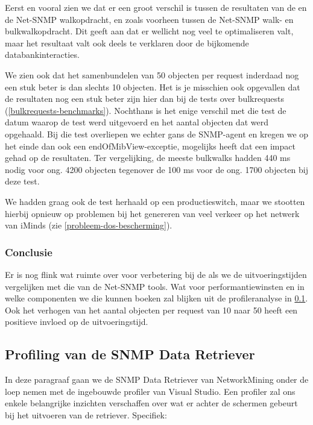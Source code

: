 Eerst en vooral zien we dat er een groot verschil is tussen de resultaten van de \nwmretriever{}
en de Net-SNMP walkopdracht, en zoals voorheen tussen de Net-SNMP walk- en bulkwalkopdracht.
Dit geeft aan dat er wellicht nog veel te optimaliseren valt, maar het resultaat valt ook deels te verklaren door de bijkomende databankinteracties.

We zien ook dat het samenbundelen van 50 objecten per request inderdaad nog een stuk beter is dan slechts 10 objecten.
Het is je misschien ook opgevallen dat de resultaten nog een stuk beter zijn hier dan bij de tests over bulkrequests (\cref{bulkrequests-benchmarks}).
Nochthans is het enige verschil met die test de datum waarop de test werd uitgevoerd en het aantal objecten dat werd opgehaald.
Bij die test overliepen we echter gans de SNMP-agent en kregen we op het einde dan ook een endOfMibView-exceptie,
mogelijks heeft dat een impact gehad op de resultaten.
Ter vergelijking, de meeste bulkwalks hadden 440 ms nodig voor ong. 4200 objecten tegenover de 100 ms voor de ong. 1700 objecten bij deze test.

We hadden graag ook de test herhaald op een productieswitch,
maar we stootten hierbij opnieuw op problemen bij het genereren van veel verkeer op het netwerk van iMinds (zie \cref{probleem-dos-bescherming}).


\subsubsection{Conclusie}

Er is nog flink wat ruimte over voor verbetering bij de \nwmretriever{} als we de uitvoeringstijden vergelijken met die van de Net-SNMP tools.
Wat voor performantiewinsten en in welke componenten we die kunnen boeken zal blijken uit de profileranalyse in \cref{profiling}.
Ook het verhogen van het aantal objecten per request van 10 naar 50 heeft een positieve invloed op de uitvoeringstijd.

\subsection{Profiling van de SNMP Data Retriever}
\label{profiling}


In deze paragraaf gaan we de SNMP Data Retriever van NetworkMining onder de loep nemen met de ingebouwde profiler van Visual Studio.
Een profiler zal ons enkele belangrijke inzichten verschaffen over wat er achter de schermen gebeurt bij het uitvoeren van de retriever.
Specifiek:

